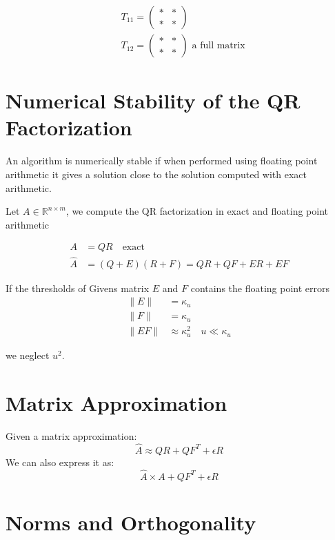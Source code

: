 \[
\begin{aligned}
&T_{11} = \begin{pmatrix}
\ast & \ast \\
\ast & \ast
\end{pmatrix} \\
&T_{12} = \begin{pmatrix}
\ast & \ast \\
\ast & \ast
\end{pmatrix} \text{ a full matrix}
\end{aligned}
\]

\section{Numerical Stability of the QR Factorization}





An algorithm is numerically stable if when performed using floating point arithmetic it gives a solution close to the solution computed with exact arithmetic.

Let $A \in \mathbb{R}^{n \times m}$, we compute the QR factorization in exact and floating point arithmetic

\begin{align*}
A &= QR \quad \text{exact} \\
\hat{A} &= (Q+E)(R+F) = QR + QF + ER + EF
\end{align*}

If the thresholds of Givens matrix $E$ and $F$ contains the floating point errors
\begin{align*}
\|E\| &= \kappa_u \\
\|F\| &= \kappa_u \\
\|EF\| &\approx \kappa_u^2 \quad u \ll \kappa_u
\end{align*}

we neglect $u^2$.

\section*{Matrix Approximation}

Given a matrix approximation:
\[
\hat{A} \approx QR + QF^T + \epsilon R
\]
We can also express it as:
\[
\hat{A} \times A + QF^T + \epsilon R
\]

\section*{Norms and Orthogonality}

